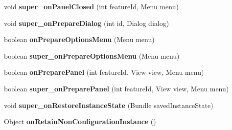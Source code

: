 \begin{DoxyCompactItemize}
void {\bfseries super\+\_\+on\+Panel\+Closed} (int feature\+Id, Menu menu)
\item 
\mbox{\label{classorg_1_1qtproject_1_1qt5_1_1android_1_1bindings_1_1_qt_activity_aacc652635f4bf45e2fa182dc44e8df13}} 
void {\bfseries super\+\_\+on\+Prepare\+Dialog} (int id, Dialog dialog)
\item 
\mbox{\label{classorg_1_1qtproject_1_1qt5_1_1android_1_1bindings_1_1_qt_activity_a71a7e747de798c51b6a385b5e8a99c61}} 
boolean {\bfseries on\+Prepare\+Options\+Menu} (Menu menu)
\item 
\mbox{\label{classorg_1_1qtproject_1_1qt5_1_1android_1_1bindings_1_1_qt_activity_a9f7f63be6b9a75253b784e80bfa74f69}} 
boolean {\bfseries super\+\_\+on\+Prepare\+Options\+Menu} (Menu menu)
\item 
\mbox{\label{classorg_1_1qtproject_1_1qt5_1_1android_1_1bindings_1_1_qt_activity_a668c15554849a0bce9422eb709b5cacc}} 
boolean {\bfseries on\+Prepare\+Panel} (int feature\+Id, View view, Menu menu)
\item 
\mbox{\label{classorg_1_1qtproject_1_1qt5_1_1android_1_1bindings_1_1_qt_activity_ab8af6f3b5a5b4547829dc68e7c31fd86}} 
boolean {\bfseries super\+\_\+on\+Prepare\+Panel} (int feature\+Id, View view, Menu menu)
\item 
\mbox{\label{classorg_1_1qtproject_1_1qt5_1_1android_1_1bindings_1_1_qt_activity_a73303f1db92072963fe8592eb05b0258}} 
void {\bfseries super\+\_\+on\+Restore\+Instance\+State} (Bundle saved\+Instance\+State)
\item 
\mbox{\label{classorg_1_1qtproject_1_1qt5_1_1android_1_1bindings_1_1_qt_activity_a5954d45f88dd09deba757e671de9077d}} 
Object {\bfseries on\+Retain\+Non\+Configuration\+Instance} ()
\item 

\end{DoxyCompactItemize}
